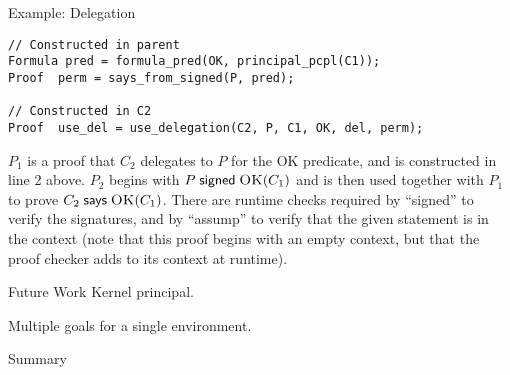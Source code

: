 \documentclass[10pt]{article}
\newcommand{\sign}[2]{\ensuremath{#1\;\textsf{signed}\;#2}}
\newcommand{\says}[2]{\ensuremath{#1\;\textsf{says}\;#2}}
\newcommand{\pred}[2]{\ensuremath{\textsc{#1}(#2)}}
\begin{document}
\begin{section}{Example: Delegation}
\begin{lstlisting}
// Constructed in parent
Formula pred = formula_pred(OK, principal_pcpl(C1));
Proof  perm = says_from_signed(P, pred);

// Constructed in C2
Proof  use_del = use_delegation(C2, P, C1, OK, del, perm);
\end{lstlisting}
$P_1$ is a proof that $C_2$ delegates to $P$ for the OK predicate, and is constructed in line 2 above.  $P_2$ begins with $\sign{P}{\pred{OK}{C_1}}$ and is then used together with $P_1$ to prove $\says{C_2}{\pred{OK}{C_1}}$.  There are runtime checks required by ``signed'' to verify the signatures, and by ``assump'' to verify that the given statement is in the context (note that this proof begins with an empty context, but that the proof checker adds to its context at runtime).  
\end{section}

\begin{section}{Future Work}
Kernel principal.
\end{section}

Multiple goals for a single environment.
\begin{section}{Summary}
\end{section}




\end{document}
